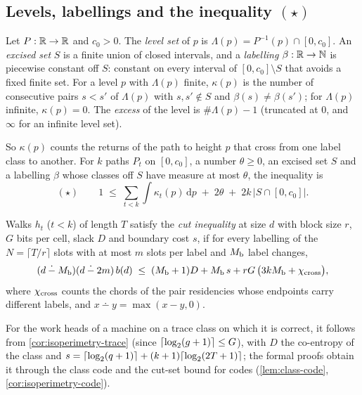 \subsection{Levels, labellings and the inequality \texorpdfstring{$(\star)$}{(*)}}

\begin{definition}\label{def:levels}
Let $P:\mathbb{R}\to\mathbb{R}$ and $c_0>0$. The \emph{level set} of $p$ is $\Lambda(p)=P^{-1}(p)\cap[0,c_0]$. An
\emph{excised set} $S$ is a finite union of closed intervals, and a \emph{labelling}
$\beta:\mathbb{R}\to\mathbb{N}$ is piecewise constant off $S$: constant on every interval of $[0,c_0]\setminus S$
that avoids a fixed finite set. For a level $p$ with $\Lambda(p)$ finite, $\kappa(p)$ is the number
of consecutive pairs $s<s'$ of $\Lambda(p)$ with $s,s'\notin S$ and $\beta(s)\ne\beta(s')$; for
$\Lambda(p)$ infinite, $\kappa(p)=0$. The \emph{excess} of the level is
$\#\Lambda(p)-1$ (truncated at $0$, and $\infty$ for an infinite level set).
\end{definition}

So $\kappa(p)$ counts the returns of the path to height $p$ that cross from one label class to
another. For $k$ paths $P_t$ on $[0,c_0]$, a number $\theta\ge0$, an excised set $S$ and a
labelling $\beta$ whose classes off $S$ have measure at most $\theta$, the inequality is
\[
  (\star)\qquad
  1\;\le\;\sum_{t<k}\int\kappa_t(p)\,\mathrm{d}p\;+\;2\theta\;+\;2k\,\bigl|S\cap[0,c_0]\bigr| .
\]

\begin{definition}\label{def:cutineq}
Walks $h_t$ ($t<k$) of length $T$ satisfy the \emph{cut inequality} at size $d$ with block size
$r$, $G$ bits per cell, slack $D$ and boundary cost $s$, if for every labelling of the
$N=\lceil T/r\rceil$ slots with at most $m$ slots per label and $M_{\mathrm{b}}$ label changes,
\[
  (d\mathbin{\dot{-}}M_{\mathrm{b}})(d\mathbin{\dot{-}}2m)\,b(d)\;\le\;(M_{\mathrm{b}}+1)D+M_{\mathrm{b}}\,s+rG\,\bigl(3kM_{\mathrm{b}}+\chi_{\mathrm{cross}}\bigr),
\]
where $\chi_{\mathrm{cross}}$ counts the chords of the pair residencies whose endpoints carry different labels, and
$x\dotminus y=\max(x-y,0)$.
\end{definition}

For the work heads of a machine on a trace class on which it is correct, it follows from \cref{cor:isoperimetry-trace} (since
$\lceil \log_2 (g+1) \rceil\le G$), with $D$ the co-entropy of the class and $s=\lceil \log_2 (q+1) \rceil+(k+1)\lceil \log_2 (2T+1) \rceil$; the formal
proofs obtain it through the class code and the cut-set bound for codes (\cref{lem:class-code},
\cref{cor:isoperimetry-code}).


